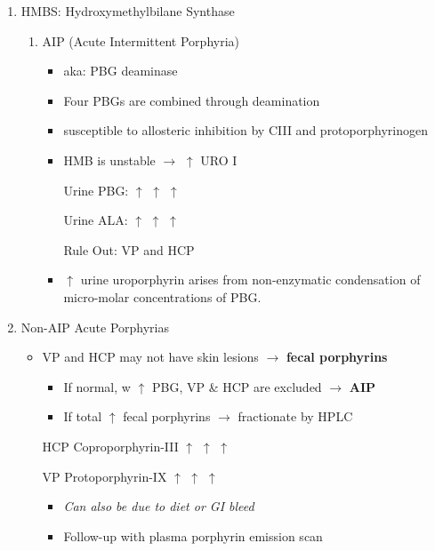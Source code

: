 \documentclass{scrartcl}
\begin{document}
\begin{enumerate}
\item HMBS: Hydroxymethylbilane Synthase
\label{sec:org3067b62}
\begin{enumerate}
\item AIP (Acute Intermittent Porphyria)
\label{sec:orgac05012}
\begin{itemize}
\item aka: PBG deaminase
\item Four PBGs are combined through deamination
\item susceptible to allosteric inhibition by CIII and protoporphyrinogen
\item HMB is unstable \(\to\) \(\uparrow\) URO I
\item[{Urine PBG:}] \(\uparrow\) \(\uparrow\) \(\uparrow\)
\item[{Urine ALA:}] \(\uparrow\) \(\uparrow\) \(\uparrow\)
\item[{Rule Out:}] VP and HCP
\item \(\uparrow\) urine uroporphyrin arises from non-enzymatic
condensation of micro-molar concentrations of PBG.
\end{itemize}
\end{enumerate}
\item Non-AIP Acute Porphyrias
\label{sec:org8a71920}
\begin{itemize}
\item VP and HCP may not have skin lesions \(\to\) \textbf{fecal porphyrins}
\begin{itemize}
\item If normal, w \(\uparrow\) PBG, VP \& HCP are excluded \(\to\) \textbf{AIP}
\item If total \(\uparrow\) fecal porphyrins \(\to\) fractionate by HPLC
\end{itemize}

\item[{HCP}] Coproporphyrin-III \(\uparrow\) \(\uparrow\) \(\uparrow\)

\item[{VP}] Protoporphyrin-IX \(\uparrow\) \(\uparrow\) \(\uparrow\)
\begin{itemize}
\item \emph{Can also be due to diet or GI bleed}
\item Follow-up with plasma porphyrin emission scan
\end{itemize}
\end{itemize}


\end{enumerate}
\end{document}

